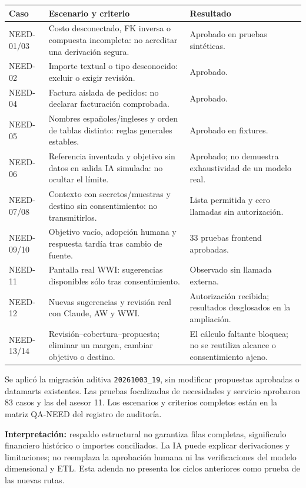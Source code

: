 \documentclass[10pt,letterpaper]{article}
\begin{document}
\small
\begin{longtable}{@{}p{}p{}p{}@{}}
\toprule Caso & Escenario y criterio & Resultado\\\midrule\endhead
NEED-01/03 & Costo desconectado, FK inversa o compuesta incompleta: no acreditar una derivación segura. & Aprobado en pruebas sintéticas.\\
NEED-02 & Importe textual o tipo desconocido: excluir o exigir revisión. & Aprobado.\\
NEED-04 & Factura aislada de pedidos: no declarar facturación comprobada. & Aprobado.\\
NEED-05 & Nombres españoles/ingleses y orden de tablas distinto: reglas generales estables. & Aprobado en fixtures.\\
NEED-06 & Referencia inventada y objetivo sin datos en salida IA simulada: no ocultar el límite. & Aprobado; no demuestra exhaustividad de un modelo real.\\
NEED-07/08 & Contexto con secretos/muestras y destino sin consentimiento: no transmitirlos. & Lista permitida y cero llamadas sin autorización.\\
NEED-09/10 & Objetivo vacío, adopción humana y respuesta tardía tras cambio de fuente. & 33 pruebas frontend aprobadas.\\
NEED-11 & Pantalla real WWI: sugerencias disponibles sólo tras consentimiento. & Observado sin llamada externa.\\
NEED-12 & Nuevas sugerencias y revisión real con Claude, AW y WWI. & Autorización recibida; resultados desglosados en la ampliación.\\
NEED-13/14 & Revisión--cobertura--propuesta; eliminar un margen, cambiar objetivo o destino. & El cálculo faltante bloquea; no se reutiliza alcance o consentimiento ajeno.\\
\bottomrule\end{longtable}
\normalsize

Se aplicó la migración aditiva \texttt{20261003\_19}, sin modificar propuestas
aprobadas o datamarts existentes. Las pruebas focalizadas de necesidades y servicio
aprobaron 83 casos y las del asesor 11. Los escenarios y criterios completos
están en la matriz QA-NEED del registro de auditoría.

\textbf{Interpretación:} respaldo estructural no garantiza filas completas,
significado financiero histórico o importes conciliados. La IA puede explicar
derivaciones y limitaciones; no reemplaza la aprobación humana ni las verificaciones
del modelo dimensional y ETL. Esta adenda no presenta los ciclos anteriores como
prueba de las nuevas rutas.
\end{document}
